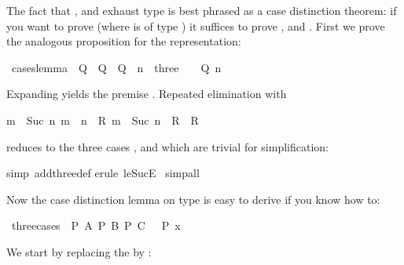 \begin{isabellebody}
\begin{isamarkuptext}
The fact that ,  and  exhaust type  is
best phrased as a case distinction theorem: if you want to prove 
(where  is of type ) it suffices to prove ,
 and . First we prove the analogous proposition for the
representation:%
\end{isamarkuptext}%
\ cases{\isacharunderscore}lemma{\isacharcolon}\ {\isachardoublequote}{\isasymlbrakk}\ Q\ {}{\isacharsemicolon}\ Q\ {}{\isacharsemicolon}\ Q\ {}{\isacharsemicolon}\ n\ {\isasymin}\ three\ {\isasymrbrakk}\ {\isasymLongrightarrow}\ \ Q\ n{\isachardoublequote}%
\begin{isamarkuptxt}%
\noindent
Expanding  yields the premise . Repeated
elimination with 
\begin{isabelle}%
{\isasymlbrakk}{\isacharquery}m\ {\isasymle}\ Suc\ {\isacharquery}n{\isacharsemicolon}\ {\isacharquery}m\ {\isasymle}\ {\isacharquery}n\ {\isasymLongrightarrow}\ {\isacharquery}R{\isacharsemicolon}\ {\isacharquery}m\ {\isacharequal}\ Suc\ {\isacharquery}n\ {\isasymLongrightarrow}\ {\isacharquery}R{\isasymrbrakk}\ {\isasymLongrightarrow}\ {\isacharquery}R%
\end{isabelle}
reduces  to the three cases ,  and
 which are trivial for simplification:%
\end{isamarkuptxt}%
simp\ add{\isacharcolon}three{\isacharunderscore}def{\isacharparenright}\isanewline
{}erule\ le{\isacharunderscore}SucE{\isacharparenright}{\isacharplus}{\isacharparenright}\isanewline
{}\ simp{\isacharunderscore}all\isanewline
{}%
\begin{isamarkuptext}%
Now the case distinction lemma on type  is easy to derive if you know how to:%
\end{isamarkuptext}%
\ three{\isacharunderscore}cases{\isacharcolon}\ {\isachardoublequote}{\isasymlbrakk}\ P\ A{\isacharsemicolon}\ P\ B{\isacharsemicolon}\ P\ C\ {\isasymrbrakk}\ {\isasymLongrightarrow}\ P\ x{\isachardoublequote}%
\begin{isamarkuptxt}%
\noindent
We start by replacing the  by :%

\end{isamarkuptxt}
\end{isabellebody}
